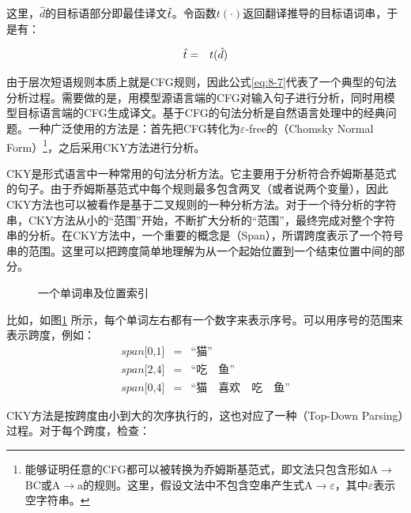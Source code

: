 \noindent 这里，$\hat{d}$的目标语部分即最佳译文$\hat{{t}}$。令函数$t(\cdot)$返回翻译推导的目标语词串，于是有：

\begin{eqnarray}
\hat{{t}} & = & t(\hat{d})
\label{eq:8-8}
\end{eqnarray}

\parinterval 由于层次短语规则本质上就是CFG规则，因此公式\eqref{eq:8-7}代表了一个典型的句法分析过程。需要做的是，用模型源语言端的CFG对输入句子进行分析，同时用模型目标语言端的CFG生成译文。基于CFG的句法分析是自然语言处理中的经典问题。一种广泛使用的方法是：首先把CFG转化为$\varepsilon$-free的{\small{}}（Chomsky Normal Form）\footnote[5]{能够证明任意的CFG都可以被转换为乔姆斯基范式，即文法只包含形如A$\to$BC或A$\to$a的规则。这里，假设文法中不包含空串产生式A$\to\varepsilon$，其中$\varepsilon$表示空字符串。}，之后采用CKY方法进行分析。

\parinterval CKY是形式语言中一种常用的句法分析方法。它主要用于分析符合乔姆斯基范式的句子。由于乔姆斯基范式中每个规则最多包含两叉（或者说两个变量），因此CKY方法也可以被看作是基于二叉规则的一种分析方法。对于一个待分析的字符串，CKY方法从小的“范围”开始，不断扩大分析的“范围”，最终完成对整个字符串的分析。在CKY方法中，一个重要的概念是{\small{}}（Span），所谓跨度表示了一个符号串的范围。这里可以把跨度简单地理解为从一个起始位置到一个结束位置中间的部分。

\begin{figure}[htp]
\centering

\caption{一个单词串及位置索引}
\label{fig:8-8}
\end{figure}

比如，如图\ref{fig:8-8} 所示，每个单词左右都有一个数字来表示序号。可以用序号的范围来表示跨度，例如：
\begin{eqnarray}
span\textrm{[0,1]}&=&\textrm{“猫”} \nonumber \\
span\textrm{[2,4]}&=&\textrm{“吃} \quad \textrm{鱼”} \nonumber \\
span\textrm{[0,4]}&=&\textrm{“猫} \quad \textrm{喜欢} \quad \textrm{吃} \quad \textrm{鱼”} \nonumber
\end{eqnarray}

\parinterval CKY方法是按跨度由小到大的次序执行的，这也对应了一种{\small{}}（Top-Down Parsing）过程。对于每个跨度，检查：

